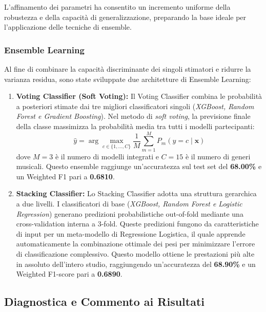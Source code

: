 \documentclass[12pt,a4paper]{article}
\begin{document}
L'affinamento dei parametri ha consentito un incremento uniforme della robustezza e della capacità di generalizzazione, preparando la base ideale per l'applicazione delle tecniche di ensemble.

\subsubsection{Ensemble Learning}

Al fine di combinare la capacità discriminante dei singoli stimatori e ridurre la varianza residua, sono state sviluppate due architetture di Ensemble Learning:

\begin{enumerate}
    \item \textbf{Voting Classifier (Soft Voting):} Il Voting Classifier combina le probabilità a posteriori stimate dai tre migliori classificatori singoli (\textit{XGBoost, Random Forest e Gradient Boosting}). Nel metodo di \textit{soft voting}, la previsione finale della classe massimizza la probabilità media tra tutti i modelli partecipanti:
    \begin{equation}
    \hat{y} = \arg\max_{c \in \{1,\dots,C\}} \frac{1}{M} \sum_{m=1}^M P_m(y=c \mid \mathbf{x})
    \label{eq:soft_voting}
    \end{equation}
    dove $M=3$ è il numero di modelli integrati e $C=15$ è il numero di generi musicali. Questo ensemble raggiunge un'accuratezza sul test set del \textbf{68.00\%} e un Weighted F1 pari a \textbf{0.6810}.
    
    \item \textbf{Stacking Classifier:} Lo Stacking Classifier adotta una struttura gerarchica a due livelli. I classificatori di base (\textit{XGBoost, Random Forest e Logistic Regression}) generano predizioni probabilistiche out-of-fold mediante una cross-validation interna a 3-fold. Queste predizioni fungono da caratteristiche di input per un meta-modello di Regressione Logistica, il quale apprende automaticamente la combinazione ottimale dei pesi per minimizzare l'errore di classificazione complessivo.
    Questo modello ottiene le prestazioni più alte in assoluto dell'intero studio, raggiungendo un'accuratezza del \textbf{68.90\%} e un Weighted F1-score pari a \textbf{0.6890}.
\end{enumerate}

\newpage
\subsection{Diagnostica e Commento ai Risultati}
\end{document}
